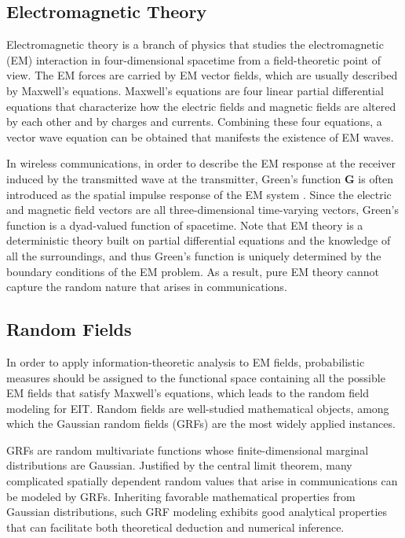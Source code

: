\documentclass[journal,twocolumn]{IEEEtran}
\begin{document}
\subsection{Electromagnetic Theory}
\label{Sec_2_Subsec_3}
Electromagnetic theory is a branch of physics that studies the electromagnetic (EM) interaction in four-dimensional spacetime from a field-theoretic point of view. The EM forces are carried by EM vector fields, which are usually described by Maxwell's equations. Maxwell's equations are four linear partial differential equations that characterize how the electric fields and magnetic fields are altered by each other and by charges and currents. Combining these four equations, a vector wave equation can be obtained that manifests the existence of EM waves. 

In wireless communications, in order to describe the EM response at the receiver induced by the transmitted wave at the transmitter, Green's function $\bm G$ is often introduced as the spatial impulse response of the EM system \cite{stratton2007electromagnetic}. Since the electric and magnetic field vectors are all three-dimensional time-varying vectors, Green's function is a dyad-valued function of spacetime. 
Note that EM theory is a deterministic theory built on partial differential equations and the knowledge of all the surroundings, and thus Green's function is uniquely determined by the boundary conditions of the EM problem.
As a result, pure EM theory cannot capture the random nature that arises in communications. 

\subsection{Random Fields}
\label{Sec_2_Subsec_4}
In order to apply information-theoretic analysis to EM fields, probabilistic measures should be assigned to the functional space containing all the possible EM fields that satisfy Maxwell's equations, which leads to the random field modeling for EIT. 
Random fields are well-studied mathematical objects, among which the Gaussian random fields (GRFs) are the most widely applied instances. 

GRFs are random multivariate functions whose finite-dimensional marginal distributions are Gaussian. Justified by the central limit theorem, many complicated spatially dependent random values that arise in communications can be modeled by GRFs.  
Inheriting favorable mathematical properties from Gaussian distributions, such GRF modeling exhibits good analytical properties that can facilitate both theoretical deduction and numerical inference. 
\end{document}
